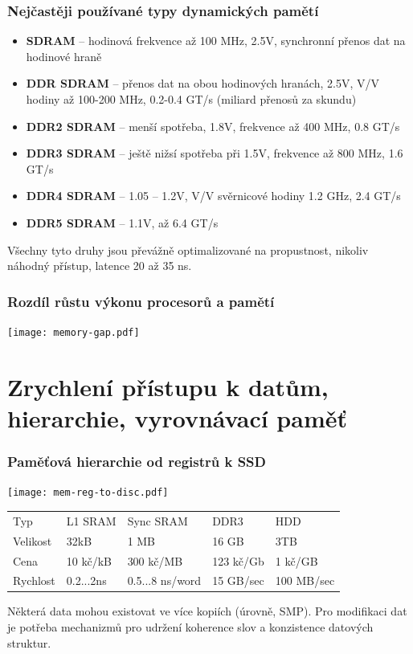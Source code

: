\documentclass{beamer}
\begin{document}
\begin{frame}
\frametitle{Nejčastěji používané typy dynamických pamětí}

\begin{itemize}
\item \textbf{SDRAM} -- hodinová frekvence až 100 MHz, 2.5V, synchronní přenos dat na hodinové hraně
\item \textbf{DDR SDRAM} -- přenos dat na obou hodinových hranách, 2.5V, V/V hodiny až 100-200 MHz, 0.2-0.4 GT/s (miliard přenosů za skundu)
\item \textbf{DDR2 SDRAM} -- menší spotřeba, 1.8V, frekvence až 400 MHz, 0.8 GT/s
\item \textbf{DDR3 SDRAM} -- ještě nižsí spotřeba při 1.5V, frekvence až 800 MHz, 1.6 GT/s
\item \textbf{DDR4 SDRAM} -- 1.05 -- 1.2V,  V/V svěrnicové hodiny 1.2 GHz, 2.4 GT/s
\item \textbf{DDR5 SDRAM} -- 1.1V, až 6.4 GT/s
\end{itemize}

Všechny tyto druhy jsou převážně optimalizované na propustnost, nikoliv náhodný přístup, latence 20 až 35 ns.

\end{frame}


\begin{frame}
\frametitle{Rozdíl růstu výkonu procesorů a pamětí}

\centering

\texttt{[image: memory-gap.pdf]}

\end{frame}

\section{Zrychlení přístupu k datům, hierarchie, vyrovnávací paměť}

\begin{frame}
\frametitle{Paměťová hierarchie od registrů k SSD}

{
\centering

\texttt{[image: mem-reg-to-disc.pdf]}

}
\vskip 2mm

\begin{tabular}{l|llll}
Typ      & L1 SRAM   & Sync SRAM &  DDR3      & HDD \\
Velikost & 32kB      & 1 MB      &  16 GB     & 3TB \\
Cena     & 10 kč/kB  & 300 kč/MB &  123 kč/Gb & 1 kč/GB \\
Rychlost & 0.2...2ns & 0.5...8 ns/word & 15 GB/sec & 100 MB/sec \\
\end{tabular}

\vskip 2mm

Některá data mohou existovat ve více kopiích (úrovně, SMP).
Pro modifikaci dat je potřeba mechanizmů pro udržení koherence slov a konzistence datových struktur.

\end{frame}
\end{document}
